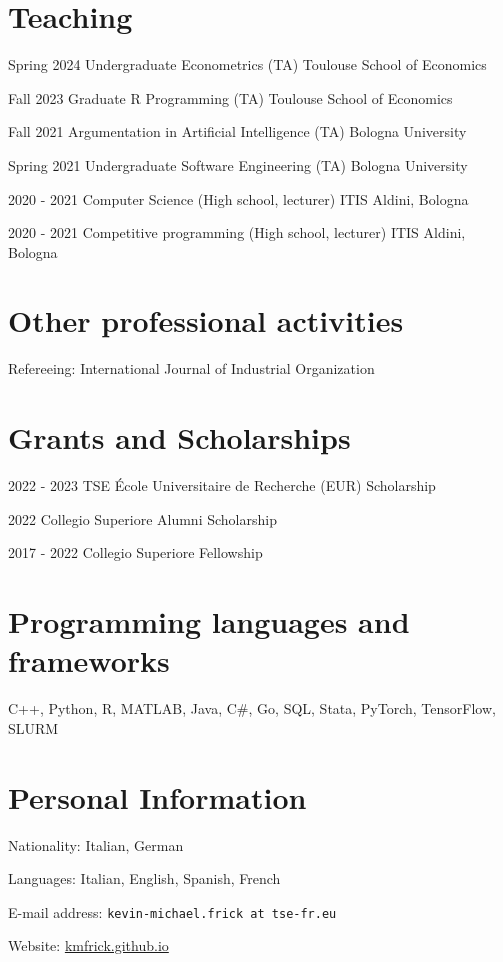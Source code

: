 \documentclass[11pt,a4paper]{article}
\begin{document}
\begin{cv}
  \section*{Teaching}
  \begin{cvlist}{}
  \itemsep -5pt
\item[Spring 2024] Undergraduate Econometrics (TA) \hfill Toulouse School of Economics
\item[Fall 2023] Graduate R Programming (TA) \hfill Toulouse School of Economics
  \item[Fall 2021] Argumentation in Artificial Intelligence (TA) \hfill Bologna University
  \item[Spring 2021] Undergraduate Software Engineering (TA) \hfill Bologna University
  \item[2020 - 2021] Computer Science (High school, lecturer) \hfill ITIS Aldini, Bologna
  \item[2020 - 2021] Competitive programming (High school, lecturer) \hfill ITIS Aldini, Bologna
  \end{cvlist}
  \vspace{-24pt}
\section*{Other professional activities}
Refereeing: International Journal of Industrial Organization
\vspace{-12pt}
\section*{Grants and Scholarships}
\begin{cvlist}{}
	\itemsep -5pt
	\item[2022 - 2023] TSE École Universitaire de Recherche (EUR) Scholarship
	\item[2022] Collegio Superiore Alumni Scholarship
	\item[2017 - 2022] Collegio Superiore Fellowship
\end{cvlist}
\vspace{-24pt}
\section*{Programming languages and frameworks}
    C++, Python, R, MATLAB, Java, C\#, Go, SQL, Stata, PyTorch, TensorFlow, SLURM
\vspace{-12pt}
\section*{Personal Information}
\begin{cvlist}{}
	\itemsep -5pt
	\item[Nationality:] Italian, German
  \item[Languages:]  Italian, English, Spanish, French
  \item[E-mail address:] \texttt{kevin-michael.frick at tse-fr.eu}
  \item[Website:] \url{kmfrick.github.io}
\end{cvlist}
\end{cv}
\end{document}
